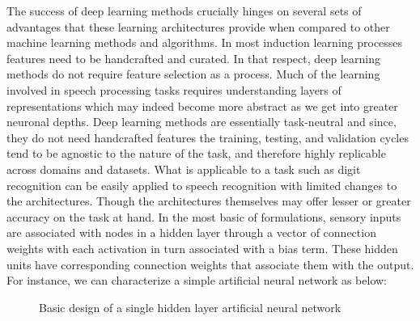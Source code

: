 \documentclass{article}[12pt]
\begin{document}
The success of deep learning methods crucially hinges on several sets of advantages that these learning architectures provide when compared to other machine learning methods and algorithms. In most induction learning processes features need to be handcrafted and curated. In that respect, deep learning methods do not require feature selection as a process. Much of the learning involved in speech processing tasks requires understanding layers of representations which may indeed become more abstract as we get into greater neuronal depths. Deep learning methods are essentially task-neutral and since, they do not need handcrafted features the training, testing, and validation cycles tend to be agnostic to the nature of the task, and therefore highly replicable across domains and datasets. What is applicable to a task such as digit recognition can be easily applied to speech recognition with limited changes to the architectures. Though the architectures themselves may offer lesser or greater accuracy on the task at hand. In the most basic of formulations, sensory inputs are associated with nodes in a hidden layer through a vector of connection weights with each activation in turn associated with a bias term. These hidden units have corresponding connection weights that associate them with the output. For instance, we can characterize a simple artificial neural network as below:
\begin{figure}
\caption{Basic design of a single hidden layer artificial neural network}
\end{figure}
\end{document}
